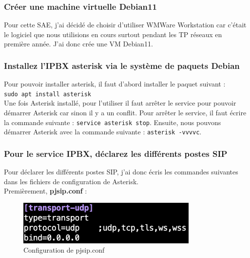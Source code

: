 \documentclass[12pt, a4paper]{article}
\begin{document}
	\subsubsection{Créer une machine virtuelle Debian11}
	Pour cette SAE, j'ai décidé de choisir d'utiliser WMWare Workstation car c'était
	le logiciel que nous utilisions en cours surtout pendant les TP réseaux en première
	année. J'ai donc crée une VM Debian11. 

	\subsubsection{Installez l'IPBX asterisk via le système de paquets Debian}
	Pour pouvoir installer asterisk, il faut d'abord installer le paquet suivant :\\
	
	\texttt{sudo apt install asterisk}\\

	Une fois Asterisk installé, pour l'utiliser il faut arrêter le service pour pouvoir
	démarrer Asterisk car sinon il y a un conflit. Pour arrêter le service, il faut
	écrire la commande suivante : \texttt{service asterisk stop}. Ensuite, nous
	pouvons démarrer Asterisk avec la commande suivante : \texttt{asterisk -vvvvc}.


	\subsubsection{Pour le service IPBX, déclarez les différents postes SIP}
	Pour déclarer les différents postes SIP, j'ai donc écris les commandes suivantes
	dans les fichiers de configuration de Asterisk.\\

	Premièrement, \textbf{pjsip.conf} :
	\begin{figure}[h]
		\centering
		\includegraphics[width=0.8\textwidth]{img/pjsip.png}
		\caption{Configuration de pjsip.conf}
		\label{fig:pjsip}
	\end{figure}
\end{document}
